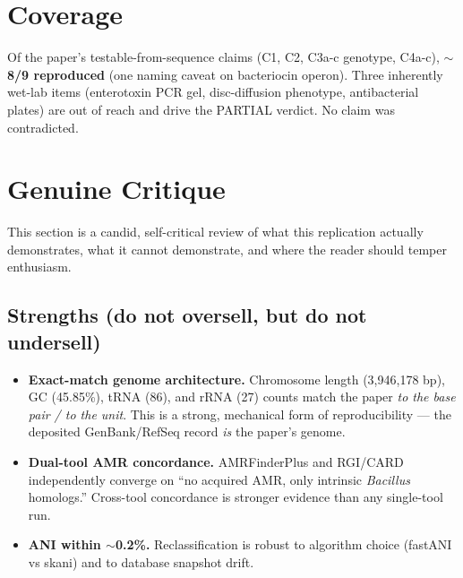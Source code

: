 \documentclass[11pt]{article}
\begin{document}
\section{Coverage}
Of the paper's testable-from-sequence claims (C1, C2, C3a-c genotype, C4a-c), \textbf{$\sim$8/9 reproduced} (one naming caveat on bacteriocin operon). Three inherently wet-lab items (enterotoxin PCR gel, disc-diffusion phenotype, antibacterial plates) are out of reach and drive the PARTIAL verdict. No claim was contradicted.

\section{Genuine Critique}
This section is a candid, self-critical review of what this replication actually demonstrates, what it cannot demonstrate, and where the reader should temper enthusiasm.

\subsection*{Strengths (do not oversell, but do not undersell)}
\begin{itemize}[leftmargin=*,noitemsep]
    \item \textbf{Exact-match genome architecture.} Chromosome length (3,946,178 bp), GC (45.85\%), tRNA (86), and rRNA (27) counts match the paper \emph{to the base pair / to the unit}. This is a strong, mechanical form of reproducibility --- the deposited GenBank/RefSeq record \emph{is} the paper's genome.
    \item \textbf{Dual-tool AMR concordance.} AMRFinderPlus and RGI/CARD independently converge on ``no acquired AMR, only intrinsic \textit{Bacillus} homologs.'' Cross-tool concordance is stronger evidence than any single-tool run.
    \item \textbf{ANI within $\sim$0.2\%.} Reclassification is robust to algorithm choice (fastANI vs skani) and to database snapshot drift.
\end{itemize}
\end{document}
